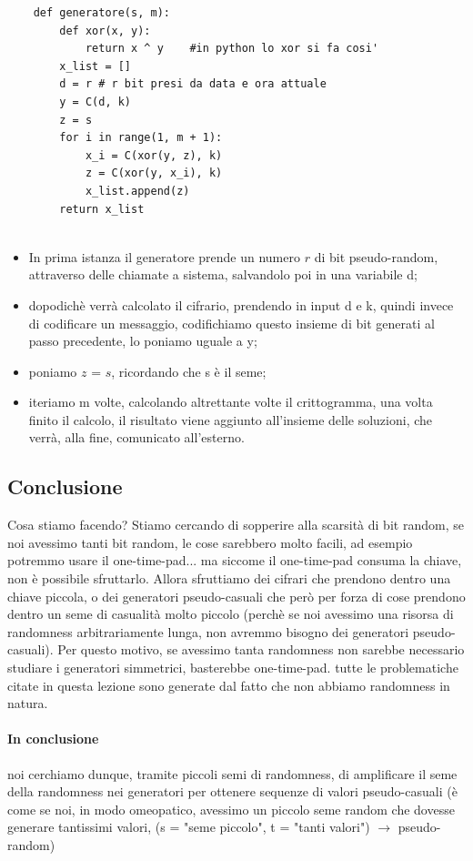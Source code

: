 \begin{lstlisting}
	def generatore(s, m):
		def xor(x, y):
			return x ^ y	#in python lo xor si fa cosi'
		x_list = []
		d = r # r bit presi da data e ora attuale
		y = C(d, k)
		z = s
		for i in range(1, m + 1):
			x_i = C(xor(y, z), k)
			z = C(xor(y, x_i), k)
			x_list.append(z)
		return x_list
			
\end{lstlisting}

\begin{itemize}
	\item In prima istanza il generatore prende un numero $r$ di bit pseudo-random, attraverso delle chiamate a sistema, salvandolo poi in una variabile d;
	\item dopodichè verrà calcolato il cifrario, prendendo in input d e k, quindi invece di codificare un messaggio, codifichiamo questo insieme di bit generati al passo precedente, lo poniamo uguale a y;
	\item poniamo $z$ = $s$, ricordando che s è il seme;
	\item iteriamo m volte, calcolando altrettante volte il crittogramma, una volta finito il calcolo, il risultato viene aggiunto all'insieme delle soluzioni, che verrà, alla fine, comunicato all'esterno.
\end{itemize}

\subsection{Conclusione}

Cosa stiamo facendo? Stiamo cercando di sopperire alla scarsità di bit random, se noi avessimo tanti bit random, le cose sarebbero molto facili, ad esempio potremmo usare il one-time-pad... ma siccome il one-time-pad consuma la chiave, non è possibile sfruttarlo. Allora sfruttiamo dei cifrari che prendono dentro una chiave piccola, o dei generatori pseudo-casuali che però per forza di cose prendono dentro un seme di casualità molto piccolo (perchè se noi avessimo una risorsa di randomness arbitrariamente lunga, non avremmo bisogno dei generatori pseudo-casuali). Per questo motivo, se avessimo tanta randomness non sarebbe necessario studiare i generatori simmetrici, basterebbe one-time-pad.  tutte le problematiche citate in questa lezione sono generate dal fatto che non abbiamo randomness in natura. 
\paragraph{In conclusione} noi cerchiamo dunque, tramite piccoli semi di randomness, di amplificare il seme della randomness nei generatori per ottenere sequenze di valori pseudo-casuali (è come se noi, in modo omeopatico, avessimo un piccolo seme random che dovesse generare tantissimi valori, (s = "seme piccolo", t = "tanti valori") $\rightarrow$ pseudo-random)